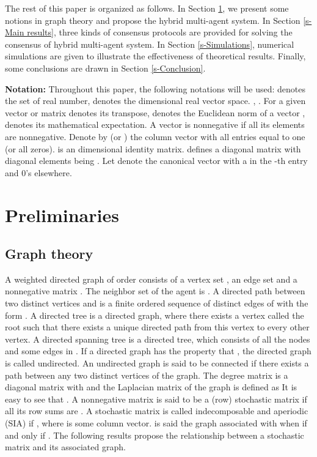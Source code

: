 \documentclass[12pt,draftcls,onecolumn]{IEEEtran}
\begin{document}
The rest of this paper is organized as follows. In Section \ref{s-preliminaries}, we present some notions in graph theory and propose the hybrid multi-agent system. In Section \ref{s-Main results}, three kinds of consensus protocols are provided for solving the consensus of hybrid multi-agent system. In Section \ref{s-Simulations}, numerical simulations are given to illustrate the effectiveness of theoretical results. Finally, some conclusions are drawn in Section \ref{s-Conclusion}.


\textbf{Notation:} Throughout this paper, the following notations will be used:  denotes the set of real number,  denotes the dimensional real vector space. , .  For a given vector or matrix   denotes its transpose,  denotes the Euclidean norm of a vector ,  denotes its mathematical expectation. A vector is nonnegative if all its elements are nonnegative. Denote by  (or ) the column vector with all entries equal to one (or all zeros).  is an dimensional identity matrix.  defines a diagonal matrix with diagonal elements being . Let  denote the canonical vector with a  in the -th entry and 0's elsewhere.

\section{Preliminaries}\label{s-preliminaries}

\subsection{Graph theory}\label{s-graph theory}

A weighted directed graph  of order 
consists of a vertex set ,  an edge set
 and a nonnegative
matrix . The neighbor set of the agent  is
. A directed path between two distinct vertices  and  is
a finite ordered sequence of distinct edges of  with the form .
A directed tree is a directed graph, where there exists a vertex called the root such that there exists a unique directed path from this vertex to every other vertex. A directed spanning tree is a directed tree, which consists of all the nodes and some edges in .
If a directed graph has the property that , the directed graph is called undirected. An undirected graph is said to be connected if there exists a path between any two distinct vertices of the graph. The degree matrix
 is a diagonal matrix with  and
the Laplacian matrix of the graph is defined as 
It is easy to see that . 
A nonnegative matrix is said to be a (row) stochastic matrix if all its row sums are . A stochastic matrix  is called indecomposable and aperiodic (SIA) if  , where  is some column vector.  is said the graph associated with  when  if and only if . The following results propose the relationship between a stochastic matrix and its associated graph.
\end{document}
